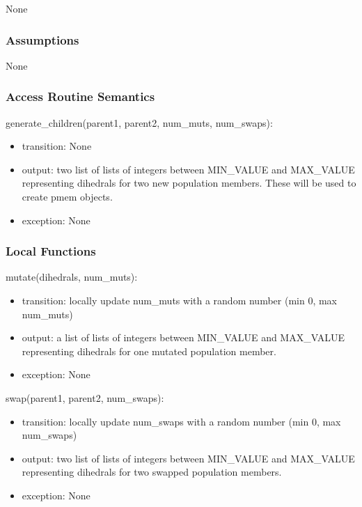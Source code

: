 \documentclass[12pt, titlepage]{article}
\begin{document}
None

\subsubsection{Assumptions}

None 

\subsubsection{Access Routine Semantics}

\noindent generate\_children(parent1, parent2, num\_muts, num\_swaps):
\begin{itemize}
	\item transition: None
	\item output: two list of lists of integers between MIN\_VALUE and 
	MAX\_VALUE representing dihedrals for two new population members. These 
	will be used to create pmem objects.
	\item exception: None
\end{itemize}

\subsubsection{Local Functions}

\noindent mutate(dihedrals, num\_muts):
\begin{itemize}
	\item transition: locally update num\_muts with a random number (min 0, max 
	num\_muts)
	\item output: a list of lists of integers between MIN\_VALUE and 
	MAX\_VALUE representing dihedrals for one mutated population member.
	\item exception: None
\end{itemize}

\noindent swap(parent1, parent2, num\_swaps):
\begin{itemize}
	\item transition: locally update num\_swaps with a random number (min 0, 
	max num\_swaps)
	\item output: two list of lists of integers between MIN\_VALUE and 
	MAX\_VALUE representing dihedrals for two swapped population members.
	\item exception: None
\end{itemize}

\newpage
\end{document}
